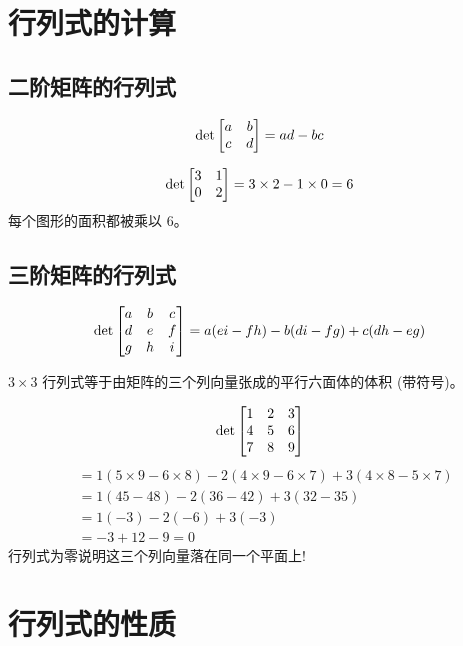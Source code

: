 \section{行列式的计算}

\subsection{二阶矩阵的行列式}

\begin{definition}
\[
\det\begin{bmatrix} a & b \\ c & d \end{bmatrix} = ad - bc
\]
\end{definition}

\begin{example}
\[
\det\begin{bmatrix} 3 & 1 \\ 0 & 2 \end{bmatrix} = 3 \times 2 - 1 \times 0 = 6
\]
每个图形的面积都被乘以 $6$。
\end{example}

\subsection{三阶矩阵的行列式}

\begin{definition}[展开公式]
\[
\det\begin{bmatrix} a & b & c \\ d & e & f \\ g & h & i \end{bmatrix} = a(ei-fh) - b(di-fg) + c(dh-eg)
\]
\end{definition}

\begin{intuition}
$3 \times 3$ 行列式等于由矩阵的三个列向量张成的平行六面体的体积 (带符号)。
\end{intuition}

\begin{example}
\[
\det\begin{bmatrix} 1 & 2 & 3 \\ 4 & 5 & 6 \\ 7 & 8 & 9 \end{bmatrix}
\]
\begin{align*}
&= 1(5 \times 9 - 6 \times 8) - 2(4 \times 9 - 6 \times 7) + 3(4 \times 8 - 5 \times 7) \\
&= 1(45-48) - 2(36-42) + 3(32-35) \\
&= 1(-3) - 2(-6) + 3(-3) \\
&= -3 + 12 - 9 = 0
\end{align*}
行列式为零说明这三个列向量落在同一个平面上!
\end{example}

\section{行列式的性质}

